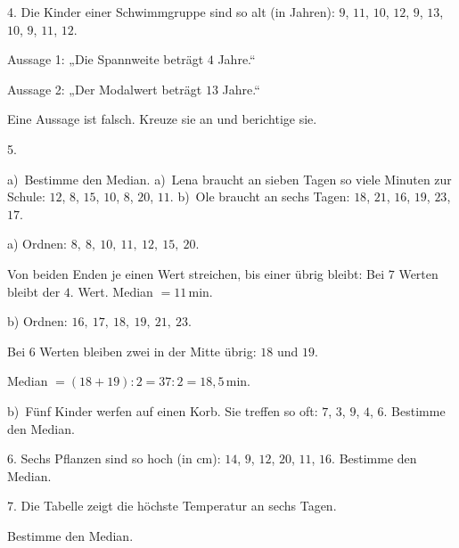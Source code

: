 \documentclass[11pt]{article}
\newcommand{\grau}[1]{{\color{mbgrau}#1}}
\begin{document}
\begin{pfaufg}{}{4.}{}
Die Kinder einer Schwimmgruppe sind so alt (in Jahren): $9$, $11$, $10$, $12$, $9$, $13$, $10$, $9$, $11$, $12$.\par Aussage 1: „Die Spannweite beträgt $4$ Jahre.“\par Aussage 2: „Der Modalwert beträgt $13$ Jahre.“\par Eine Aussage ist falsch. Kreuze sie an und berichtige sie.\par\smallskip {}
\end{pfaufg}

\begin{pfaufg}{}{5.}{}
\grau{a)\ Bestimme den Median. a)~Lena braucht an sieben Tagen so viele Minuten zur Schule: $12$, $8$, $15$, $10$, $8$, $20$, $11$. b)~Ole braucht an sechs Tagen: $18$, $21$, $16$, $19$, $23$, $17$.\par\smallskip a) Ordnen: $8,\ 8,\ 10,\ 11,\ 12,\ 15,\ 20$.\par Von beiden Enden je einen Wert streichen, bis einer übrig bleibt: Bei $7$ Werten bleibt der $4.$ Wert. Median $= 11$\,min.\par b) Ordnen: $16,\ 17,\ 18,\ 19,\ 21,\ 23$.\par Bei $6$ Werten bleiben zwei in der Mitte übrig: $18$ und $19$.\par Median $= (18 + 19) : 2 = 37 : 2 = 18{,}5$\,min.}
\par\medskip
b)\ Fünf Kinder werfen auf einen Korb. Sie treffen so oft: $7$, $3$, $9$, $4$, $6$. Bestimme den Median.
\end{pfaufg}

\begin{pfaufg}{}{6.}{}
Sechs Pflanzen sind so hoch (in cm): $14$, $9$, $12$, $20$, $11$, $16$. Bestimme den Median.
\end{pfaufg}

\begin{pfaufg}{}{7.}{}
Die Tabelle zeigt die höchste Temperatur an sechs Tagen.\par\vspace{3pt} \par\vspace{3pt} Bestimme den Median.
\end{pfaufg}
\end{document}
